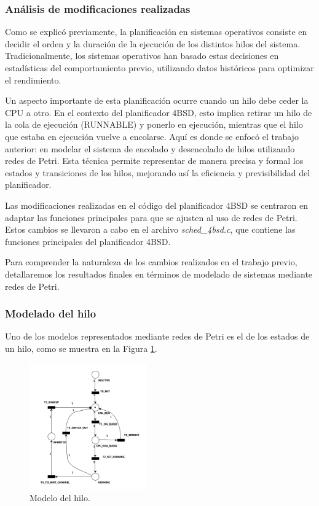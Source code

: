\subsubsection{Análisis de modificaciones realizadas}

Como se explicó previamente, la planificación en sistemas operativos consiste en decidir el orden y la duración de la ejecución de los distintos hilos del sistema. Tradicionalmente, los sistemas operativos han basado estas decisiones en estadísticas del comportamiento previo, utilizando datos históricos para optimizar el rendimiento.

Un aspecto importante de esta planificación ocurre cuando un hilo debe ceder la CPU a otro. En el contexto del planificador 4BSD, esto implica retirar un hilo de la cola de ejecución (RUNNABLE) y ponerlo en ejecución, mientras que el hilo que estaba en ejecución vuelve a encolarse. Aquí es donde se enfocó el trabajo anterior: en modelar el sistema de encolado y desencolado de hilos utilizando redes de Petri. Esta técnica permite representar de manera precisa y formal los estados y transiciones de los hilos, mejorando así la eficiencia y previsibilidad del planificador.

Las modificaciones realizadas en el código del planificador 4BSD se centraron en adaptar las funciones principales para que se ajusten al uso de redes de Petri. Estos cambios se llevaron a cabo en el archivo \textit{sched\_4bsd.c}, que contiene las funciones principales del planificador 4BSD.

Para comprender la naturaleza de los cambios realizados en el trabajo previo, detallaremos los resultados finales en términos de modelado de sistemas mediante redes de Petri.

\subsubsection{Modelado del hilo}

Uno de los modelos representados mediante redes de Petri es el de los estados de un hilo, como se muestra en la Figura \ref{fig:threadModel}.\par

\begin{figure}[H]
    \centering
    \includegraphics[width=0.45\textwidth]{images/Thread_Net.png}
    \caption{Modelo del hilo.}
    \label{fig:threadModel}
\end{figure}

